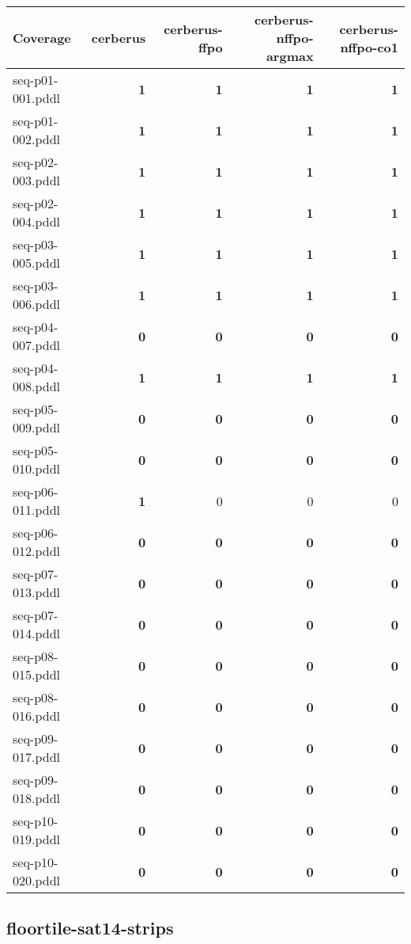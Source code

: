 \documentclass{article}
\begin{document}
\begin{tabular}{@{}lrrrr@{}}
Coverage & cerberus & cerberus-ffpo & cerberus-nffpo-argmax & cerberus-nffpo-co1 \\
\midrule
seq-p01-001.pddl & \textbf{1} & \textbf{1} & \textbf{1} & \textbf{1} \\
seq-p01-002.pddl & \textbf{1} & \textbf{1} & \textbf{1} & \textbf{1} \\
seq-p02-003.pddl & \textbf{1} & \textbf{1} & \textbf{1} & \textbf{1} \\
seq-p02-004.pddl & \textbf{1} & \textbf{1} & \textbf{1} & \textbf{1} \\
seq-p03-005.pddl & \textbf{1} & \textbf{1} & \textbf{1} & \textbf{1} \\
seq-p03-006.pddl & \textbf{1} & \textbf{1} & \textbf{1} & \textbf{1} \\
seq-p04-007.pddl & \textbf{0} & \textbf{0} & \textbf{0} & \textbf{0} \\
seq-p04-008.pddl & \textbf{1} & \textbf{1} & \textbf{1} & \textbf{1} \\
seq-p05-009.pddl & \textbf{0} & \textbf{0} & \textbf{0} & \textbf{0} \\
seq-p05-010.pddl & \textbf{0} & \textbf{0} & \textbf{0} & \textbf{0} \\
seq-p06-011.pddl & \textbf{1} & 0 & 0 & 0 \\
seq-p06-012.pddl & \textbf{0} & \textbf{0} & \textbf{0} & \textbf{0} \\
seq-p07-013.pddl & \textbf{0} & \textbf{0} & \textbf{0} & \textbf{0} \\
seq-p07-014.pddl & \textbf{0} & \textbf{0} & \textbf{0} & \textbf{0} \\
seq-p08-015.pddl & \textbf{0} & \textbf{0} & \textbf{0} & \textbf{0} \\
seq-p08-016.pddl & \textbf{0} & \textbf{0} & \textbf{0} & \textbf{0} \\
seq-p09-017.pddl & \textbf{0} & \textbf{0} & \textbf{0} & \textbf{0} \\
seq-p09-018.pddl & \textbf{0} & \textbf{0} & \textbf{0} & \textbf{0} \\
seq-p10-019.pddl & \textbf{0} & \textbf{0} & \textbf{0} & \textbf{0} \\
seq-p10-020.pddl & \textbf{0} & \textbf{0} & \textbf{0} & \textbf{0} \\
\end{tabular}

\hypertarget{coverage-floortile-sat14-strips}{}
\subsection*{floortile-sat14-strips}
\end{document}
